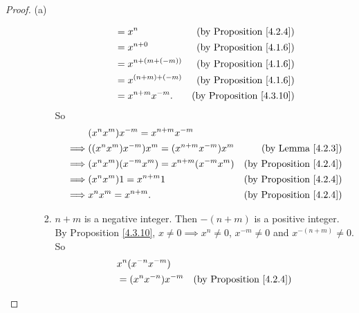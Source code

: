 \begin{proof}{(a)}
\begin{enumerate}[label=(\Roman*)]
\begin{enumerate}[label=(\roman*)]
\begin{enumerate}[label=(\arabic*)]
\begin{align*}
                                       & = x^n                & \text{(by Proposition \ref{4.2.4})}  \\
                                       & = x^{n + 0}          & \text{(by Proposition \ref{4.1.6})}  \\
                                       & = x^{n + (m + (-m))} & \text{(by Proposition \ref{4.1.6})}  \\
                                       & = x^{(n + m) + (-m)} & \text{(by Proposition \ref{4.1.6})}  \\
                                       & = x^{n + m} x^{-m}.  & \text{(by Proposition \ref{4.3.10})}
                                  \end{align*}
                                  So
                                  \begin{align*}
                                               & (x^n x^m) x^{-m} = x^{n + m} x^{-m}                                                   \\
                                      \implies & ((x^n x^m) x^{-m}) x^m = (x^{n + m} x^{-m}) x^m & \text{(by Lemma \ref{4.2.3})}       \\
                                      \implies & (x^n x^m)(x^{-m} x^m) = x^{n + m} (x^{-m} x^m)  & \text{(by Proposition \ref{4.2.4})} \\
                                      \implies & (x^n x^m)1 = x^{n + m} 1                        & \text{(by Proposition \ref{4.2.4})} \\
                                      \implies & x^n x^m = x^{n + m}.                            & \text{(by Proposition \ref{4.2.4})} \\
                                  \end{align*}
                            \item \(n + m\) is a negative integer.
                                  Then \(-(n + m)\) is a positive integer.
                                  By Proposition \ref{4.3.10}, \(x \neq 0 \implies x^n \neq 0\), \(x^{-m} \neq 0\) and \(x^{-(n + m)} \neq 0\).
                                  So
                                  \begin{align*}
                                       & x^n (x^{-n} x^{-m})                                              \\
                                       & = (x^n x^{-n})x^{-m}      & \text{(by Proposition \ref{4.2.4})}  \\

\end{align*}
\end{enumerate}
\end{enumerate}
\end{enumerate}
\end{proof}

